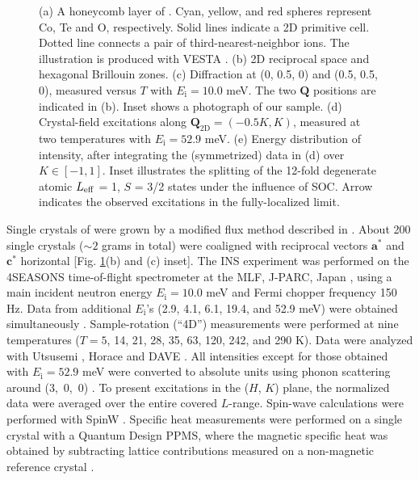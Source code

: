 \documentclass[%
reprint,
superscriptaddress,
amsmath,amssymb,
aps,
prb,
]{revtex4-2}
\begin{document}
\begin{figure}[t!]
	\caption{(a) A honeycomb layer of . Cyan, yellow, and red spheres represent Co, Te and O, respectively. Solid lines indicate a 2D primitive cell. Dotted line connects a pair of third-nearest-neighbor  ions. The illustration is produced with VESTA \cite{MommaJAC2011}. (b) 2D reciprocal space and hexagonal Brillouin zones. (c) Diffraction at (0, 0.5, 0) and (0.5, 0.5, 0), measured versus $T$ with $E_\mathrm{i} = 10.0$ meV. The two $\mathbf{Q}$ positions are indicated in (b). Inset shows a photograph of our sample. (d) Crystal-field excitations along $\mathbf{Q}_{\mathrm{2D}}=(-0.5 K, K)$, measured at two temperatures with $E_\mathrm{i} = 52.9$ meV. (e) Energy distribution of intensity, after integrating the (symmetrized) data in (d) over $K \in [-1, 1]$. Inset illustrates the splitting of the 12-fold degenerate atomic $L_{\rm{eff}}$ = 1, $S$ = 3/2 states under the influence of SOC. Arrow indicates the observed excitations in the fully-localized limit.}
	\label{fig1}
\end{figure}
	
Single crystals of  were grown by a modified flux method described in \cite{SM}. About 200 single crystals ($\sim2$ grams in total) were coaligned with reciprocal vectors $\textbf{a}^*$ and $\textbf{c}^*$ horizontal [Fig. \ref{fig1}(b) and (c) inset]. The INS experiment was performed on the 4SEASONS time-of-flight spectrometer at the MLF, J-PARC, Japan \cite{KajimotoJPSJS2011}, using a main incident neutron energy $E_\mathrm{i} = 10.0$ meV and Fermi chopper frequency 150 Hz. Data from additional $E_\mathrm{i}$'s (2.9, 4.1, 6.1, 19.4, and 52.9 meV) were obtained simultaneously \cite{NakamuraJPSJ2009}. Sample-rotation (``4D'') measurements were performed at nine temperatures ($T = 5$, 14, 21, 28, 35, 63, 120, 242, and 290 K). Data were analyzed with Utsusemi \cite{InamuraJPSJ2013}, Horace \cite{EwingsHorace2016} and DAVE \cite{AzuahNIST2009}. All intensities except for those obtained with $E_\mathrm{i} = 52.9$ meV were converted to absolute units \cite{XuRSI2013} using phonon scattering around (3,~0,~0) \cite{SM}. To present excitations in the ($H$, $K$) plane, the normalized data were averaged over the entire covered $L$-range. Spin-wave calculations were performed with SpinW \cite{TothJPCM2015}. Specific heat measurements were performed on a single crystal with a Quantum Design PPMS, where the magnetic specific heat was obtained by subtracting lattice contributions measured on a non-magnetic  reference crystal \cite{YaoPRB2020}.
	
\end{document}

